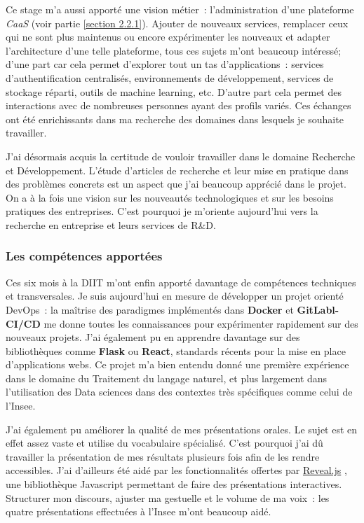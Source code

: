 Ce stage m'a aussi apporté une vision métier~: l'administration d'une plateforme \textit{CaaS} (voir partie \ref{section 2.2.1}). Ajouter de nouveaux services, remplacer ceux qui ne sont plus maintenus ou encore expérimenter les nouveaux et adapter l'architecture d'une telle plateforme, tous ces sujets m'ont beaucoup intéressé; d'une part car cela permet d'explorer tout un tas d'applications~: services d'authentification centralisés, environnements de développement, services de stockage réparti, outils de machine learning, etc. D'autre part cela permet des interactions avec de nombreuses personnes ayant des profils variés. Ces échanges ont été enrichissants dans ma recherche des domaines dans lesquels je souhaite travailler.  
\newline

J'ai désormais acquis la certitude de vouloir travailler dans le domaine Recherche et Développement. L'étude d'articles de recherche et leur mise en pratique dans des problèmes concrets est un aspect que j'ai beaucoup apprécié dans le projet. On a à la fois une vision sur les nouveautés technologiques et sur les besoins pratiques des entreprises. C'est pourquoi je m'oriente aujourd'hui vers la recherche en entreprise et leurs services de R\&D.
\newline

\subsubsection{Les compétences apportées}

Ces six mois à la DIIT m'ont enfin apporté davantage de compétences techniques et transversales. Je suis aujourd'hui en mesure de développer un projet orienté DevOps~: la maîtrise des paradigmes implémentés dans \textbf{Docker} et \textbf{GitLabl-CI/CD} me donne toutes les connaissances pour expérimenter rapidement sur des nouveaux projets. J'ai également pu en apprendre davantage sur des bibliothèques comme \textbf{Flask} ou \textbf{React}, standards récents pour la mise en place d'applications webs. Ce projet m'a bien entendu donné une première expérience dans le domaine du Traitement du langage naturel, et plus largement dans l'utilisation des Data sciences dans des contextes très spécifiques comme celui de l'Insee.
\newline

J'ai également pu améliorer la qualité de mes présentations orales. Le sujet est en effet assez vaste et utilise du vocabulaire spécialisé. C'est pourquoi j'ai dû travailler la présentation de mes résultats plusieurs fois afin de les rendre accessibles. J'ai d'ailleurs été aidé par les fonctionnalités offertes par \href{https://revealjs.com}{Reveal.js} \cite{}, une bibliothèque Javascript permettant de faire des présentations interactives. Structurer mon discours, ajuster ma gestuelle et le volume de ma voix~: les quatre présentations effectuées à l'Insee m'ont beaucoup aidé.
\newline

